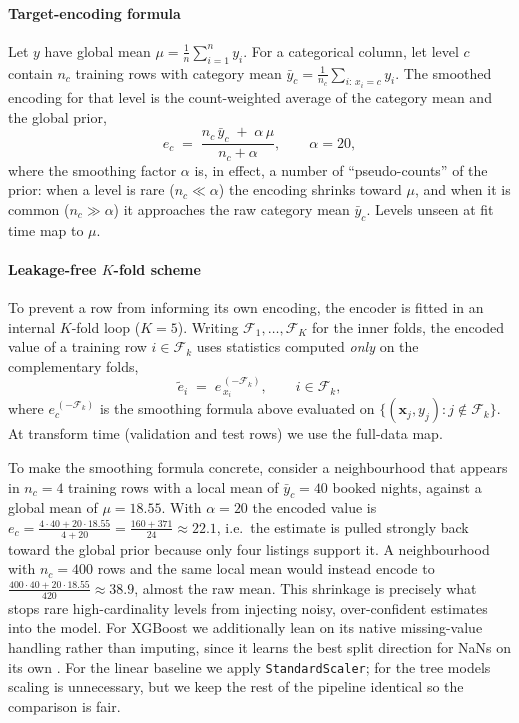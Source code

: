 \documentclass[journal]{IEEEtran}
\begin{document}
\paragraph{Target-encoding formula} Let $y$ have global mean
$\mu=\tfrac{1}{n}\sum_{i=1}^{n}y_i$. For a categorical column, let level $c$
contain $n_c$ training rows with category mean
$\bar y_c=\tfrac{1}{n_c}\sum_{i:\,x_i=c}y_i$. The smoothed encoding for that
level is the count-weighted average of the category mean and the global prior,
\begin{equation}
e_c \;=\; \frac{n_c\,\bar y_c \;+\; \alpha\,\mu}{\,n_c+\alpha\,},
\qquad \alpha = 20,
\label{eq:smooth}
\end{equation}
where the smoothing factor $\alpha$ is, in effect, a number of ``pseudo-counts''
of the prior: when a level is rare ($n_c\!\ll\!\alpha$) the encoding shrinks
toward $\mu$, and when it is common ($n_c\!\gg\!\alpha$) it approaches the raw
category mean $\bar y_c$. Levels unseen at fit time map to $\mu$.

\paragraph{Leakage-free $K$-fold scheme} To prevent a row from informing its own
encoding, the encoder is fitted in an internal $K$-fold loop ($K=5$). Writing
$\mathcal{F}_1,\dots,\mathcal{F}_K$ for the inner folds, the encoded value of a
training row $i\in\mathcal{F}_k$ uses statistics computed \emph{only} on the
complementary folds,
\begin{equation}
\tilde e_i \;=\; e^{\,(-\mathcal{F}_k)}_{\,x_i},
\qquad i\in\mathcal{F}_k,
\label{eq:kfoldte}
\end{equation}
where $e^{\,(-\mathcal{F}_k)}_{c}$ is the smoothing formula above evaluated on
$\{(\mathbf{x}_j,y_j):j\notin\mathcal{F}_k\}$. At transform time (validation and
test rows) we use the full-data map.

To make the smoothing formula concrete, consider a neighbourhood that appears in
$n_c=4$ training rows with a local mean of $\bar y_c=40$ booked nights, against a
global mean of $\mu=18.55$. With $\alpha=20$ the encoded value is
$e_c=\frac{4\cdot 40+20\cdot 18.55}{4+20}=\frac{160+371}{24}\approx 22.1$, i.e.\
the estimate is pulled strongly back toward the global prior because only four
listings support it. A neighbourhood with $n_c=400$ rows and the same local mean
would instead encode to $\frac{400\cdot40+20\cdot18.55}{420}\approx 38.9$, almost
the raw mean. This shrinkage is precisely what stops rare high-cardinality levels
from injecting noisy, over-confident estimates into the model. For XGBoost we additionally lean on its
native missing-value handling rather than imputing, since it learns the best
split direction for NaNs on its own \cite{chen2016xgboost}. For the linear
baseline we apply \texttt{StandardScaler}; for the tree models scaling is
unnecessary, but we keep the rest of the pipeline identical so the comparison is
fair.
\end{document}
